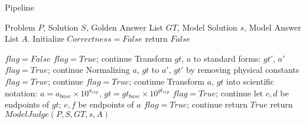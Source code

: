\begin{algorithm}[t] 
   \caption{{\judge} Pipeline} 
   \label{alg:judge} 
\begin{algorithmic} 
    Problem $P$, Solution $S$, Golden Answer List $GT$, Model Solution $s$, Model Answer List $A$.
   \STATE Initialize $Correctness = False$
   \STATE return $False$
   \ENDIF

    \STATE $flag = False$
   \STATE $flag = True$; continue
   \ENDIF %
   \STATE Transform $gt$, $a$ to standard forms: $gt'$, $a'$
   \STATE $flag = True$; continue
   \ENDIF
   \ENDIF %
   \STATE Normalizing $a$, $gt$ to $a'$, $gt'$ by removing physical constants
   \STATE $flag = True$; continue
    \STATE $flag = True$; continue
   \ENDIF
   \ENDIF %
   \STATE Transform $a$, $gt$ into scientific notation: $a = a_{base} \times 10^{a_{exp}}$, $gt = gt_{base} \times 10^{gt_{exp}}$
   \STATE $flag = True$; continue
   \ENDIF
   \ENDIF %
   \STATE let $c, d$ be endpoints of $gt$; $e, f$ be endpoints of $a$
   \STATE $flag = True$; continue
   \ENDIF
   \ENDIF
   \ENDFOR
   \STATE return $True$
   \ELSE
   \STATE return $ModelJudge(P, S, GT, s, A)$
   \ENDIF
\end{algorithmic} 
\end{algorithm} 



